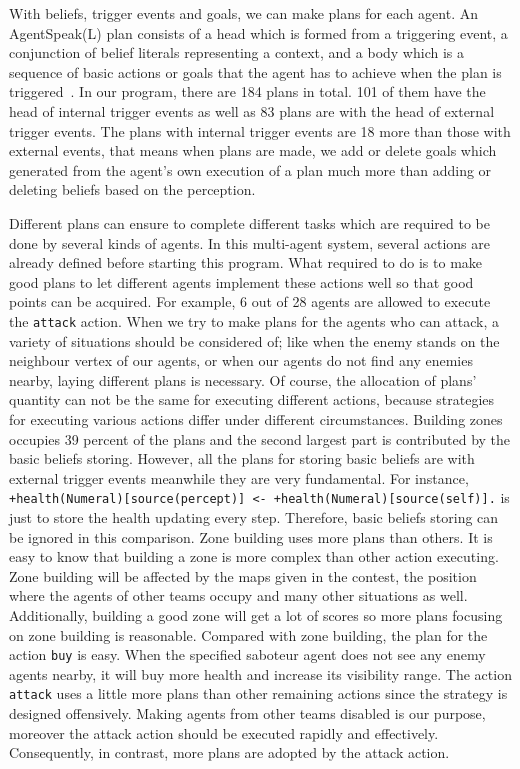 With beliefs, trigger events and goals, we can make plans for each agent.
An AgentSpeak(L) plan consists of a head which is formed from a triggering event, a conjunction of belief literals representing a context, and a body which is a sequence of basic actions or goals that the agent has to achieve when the plan is triggered~\cite{rafael_BDIAgent_2005}.
In our program, there are 184 plans in total.
101 of them have the head of internal trigger events as well as 83 plans are with the head of external trigger events.
The plans with internal trigger events are 18 more than those with external events, that means when plans are made, we add or delete goals which generated from the agent's own execution of a plan much more than adding or deleting beliefs based on the perception.

Different plans can ensure to complete different tasks which are required to be done by several kinds of agents.
In this multi-agent system, several actions are already defined before starting this program.
What required to do is to make good plans to let different agents implement these actions well so that good points can be acquired.
For example, 6 out of 28 agents are allowed to execute the \texttt{attack} action.
When we try to make plans for the agents who can attack, a variety of situations should be considered of; like when the enemy stands on the neighbour vertex of our agents, or when our agents do not find any enemies nearby, laying different plans is necessary.
Of course, the allocation of plans' quantity can not be the same for executing different actions, because strategies for executing various actions differ under different circumstances.
Building zones occupies 39 percent of the plans and the second largest part is contributed by the basic beliefs storing.
However, all the plans for storing basic beliefs are with external trigger events meanwhile they are very fundamental.
For instance, \texttt{+health(Numeral)[source(percept)] <- +health(Numeral)[source(self)].} is just to store the health updating every step.
Therefore, basic beliefs storing can be ignored in this comparison.
Zone building uses more plans than others.
It is easy to know that building a zone is more complex than other action executing.
Zone building will be affected by the maps given in the contest, the position where the agents of other teams occupy and many other situations as well.
Additionally, building a good zone will get a lot of scores so more plans focusing on zone building is reasonable.
Compared with zone building, the plan for the action \texttt{buy} is easy.
When the specified saboteur agent does not see any enemy agents nearby, it will buy more health and increase its visibility range.
The action \texttt{attack} uses a little more plans than other remaining actions since the strategy is designed offensively.
Making agents from other teams disabled is our purpose, moreover the attack action should be executed rapidly and effectively.
Consequently, in contrast, more plans are adopted by the attack action.

